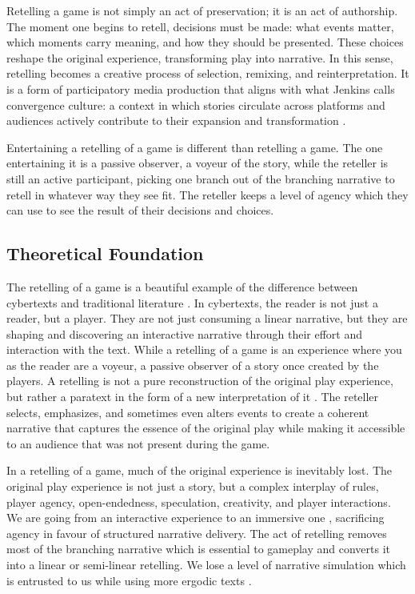 Retelling a game is not simply an act of preservation; it is an act of authorship. The moment one begins to retell, decisions must be made: what events matter, which moments carry meaning, and how they should be presented. These choices reshape the original experience, transforming play into narrative. In this sense, retelling becomes a creative process of selection, remixing, and reinterpretation. It is a form of participatory media production that aligns with what Jenkins calls convergence culture: a context in which stories circulate across platforms and audiences actively contribute to their expansion and transformation \cite{jenkins2008convergence}.

Entertaining a retelling of a game is different than retelling a game. The one entertaining it is a passive observer, a voyeur of the story, while the reteller is still an active participant, picking one branch out of the branching narrative to retell in whatever way they see fit. The reteller keeps a level of agency which they can use to see the result of their decisions and choices.

\subsection*{Theoretical Foundation}
The retelling of a game is a beautiful example of the difference between cybertexts and traditional literature \cite{aarseth1995cybertext}. In cybertexts, the reader is not just a reader, but a player. They are not just consuming a linear narrative, but they are shaping and discovering an interactive narrative through their effort and interaction with the text. While a retelling of a game is an experience where you as the reader are a voyeur, a passive observer of a story once created by the players. A retelling is not a pure reconstruction of the original play experience, but rather a paratext in the form of a new interpretation of it \cite{gray2010show}. The reteller selects, emphasizes, and sometimes even alters events to create a coherent narrative that captures the essence of the original play while making it accessible to an audience that was not present during the game.

In a retelling of a game, much of the original experience is inevitably lost. The original play experience is not just a story, but a complex interplay of rules, player agency, open-endedness, speculation, creativity, and player interactions. We are going from an interactive experience to an immersive one \cite{ryan2015narrative}, sacrificing agency in favour of structured narrative delivery. The act of retelling removes most of the branching narrative which is essential to gameplay and converts it into a linear or semi-linear retelling. We lose a level of narrative simulation which is entrusted to us while using more ergodic texts \cite{aarseth1995cybertext}. 

